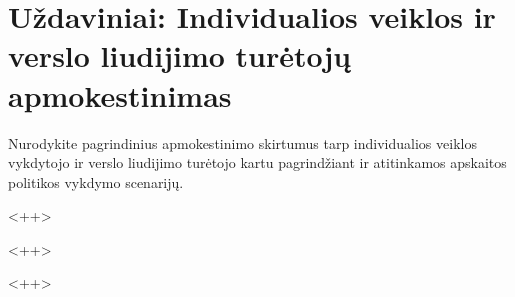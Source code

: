 \chapter{Uždaviniai: Individualios veiklos ir verslo liudijimo turėtojų
apmokestinimas}

\begin{tasks}
  
  \begin{task}
    \begin{condition}
      Nurodykite pagrindinius apmokestinimo skirtumus tarp individualios
      veiklos vykdytojo ir verslo liudijimo turėtojo kartu
      pagrindžiant ir atitinkamos apskaitos politikos vykdymo
      scenarijų.
    \end{condition}
    \begin{solution}
      
    \end{solution}<++>
  \end{task}<++>
\end{tasks}<++>


